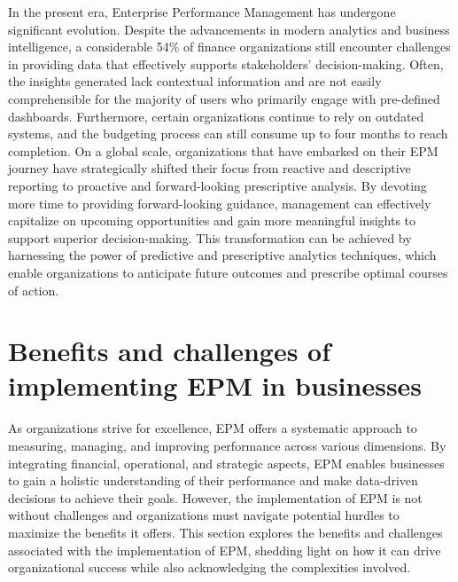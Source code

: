 \documentclass[12pt,a4paper,openright,twoside]{book}
\begin{document}
In the present era, Enterprise Performance Management has undergone significant evolution. 
%
Despite the advancements in modern analytics and business intelligence, a considerable 54\% of finance organizations still encounter challenges in providing data that effectively supports stakeholders' decision-making.\cite{gartner2021report}
%
Often, the insights generated lack contextual information and are not easily comprehensible for the majority of users who primarily engage with pre-defined dashboards. 
%
Furthermore, certain organizations continue to rely on outdated systems, and the budgeting process can still consume up to four months to reach completion.
%
On a global scale, organizations that have embarked on their EPM journey have strategically shifted their focus from reactive and descriptive reporting to proactive and forward-looking prescriptive analysis. 
%
By devoting more time to providing forward-looking guidance, management can effectively capitalize on upcoming opportunities and gain more meaningful insights to support superior decision-making. 
%
This transformation can be achieved by harnessing the power of predictive and prescriptive analytics techniques, which enable organizations to anticipate future outcomes and prescribe optimal courses of action.

\section{Benefits and challenges of implementing EPM in businesses}

As organizations strive for excellence, EPM offers a systematic approach to measuring, managing, and improving performance across various dimensions. 
%
By integrating financial, operational, and strategic aspects, EPM enables businesses to gain a holistic understanding of their performance and make data-driven decisions to achieve their goals. 
%
However, the implementation of EPM is not without challenges and organizations must navigate potential hurdles to maximize the benefits it offers.
%
This section explores the benefits and challenges associated with the implementation of EPM, shedding light on how it can drive organizational success while also acknowledging the complexities involved.
\end{document}
